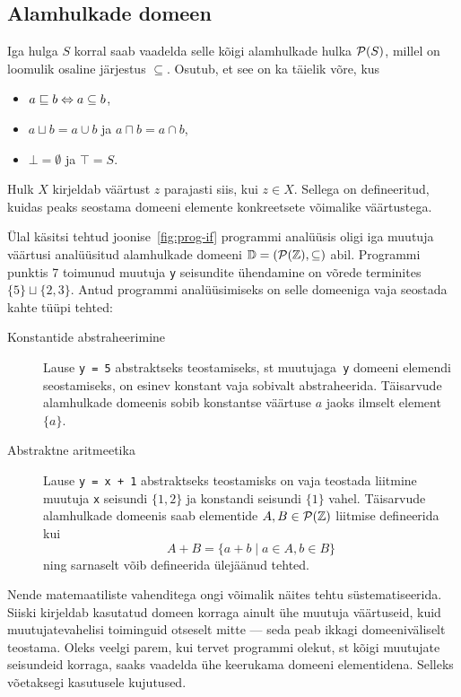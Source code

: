 \documentclass[../thesis.tex]{subfiles}
\begin{document}
\subsection{Alamhulkade domeen}
Iga hulga $S$ korral saab vaadelda selle kõigi alamhulkade hulka $\mathcal{P}(S)$, millel on loomulik osaline järjestus $\subseteq$.
Osutub, et see on ka täielik võre, kus
\begin{itemize}[nosep]
	\item $a \sqsubseteq b \Leftrightarrow a \subseteq b$,
	\item $a \sqcup b = a \cup b$ ja $a \sqcap b = a \cap b$,
	\item $\bot = \emptyset$ ja $\top = S$.
\end{itemize}

Hulk $X$ kirjeldab väärtust $z$ parajasti siis, kui $z \in X$. Sellega on defineeritud, kuidas peaks seostama domeeni elemente konkreetsete võimalike väärtustega.

Ülal käsitsi tehtud joonise~\ref{fig:prog-if} programmi analüüsis oligi iga muutuja väärtusi analüüsitud alamhulkade domeeni $\mathbb{D} = (\mathcal{P}(\mathbb{Z}), \subseteq)$ abil. Programmi punktis 7 toimunud muutuja \texttt{y} seisundite ühendamine on võrede terminites $\{5\} \sqcup \{2, 3\}$. Antud programmi analüüsimiseks on selle domeeniga vaja seostada kahte tüüpi tehted:
\begin{description}
	\item[Konstantide abstraheerimine] Lause \texttt{y = 5} abstraktseks teostamiseks, st muutujaga~\texttt{y} domeeni elemendi seostamiseks, on esinev konstant vaja sobivalt abstraheerida. Täisarvude alamhulkade domeenis sobib konstantse väärtuse $a$ jaoks ilmselt element $\{a\}$.

	\item[Abstraktne aritmeetika] Lause \texttt{y = x + 1} abstraktseks teostamisks on vaja teostada liitmine muutuja \texttt{x} seisundi $\{1, 2\}$ ja konstandi seisundi $\{1\}$ vahel. Täisarvude alamhulkade domeenis saab elementide $A, B \in \mathcal{P}(\mathbb{Z})$ liitmise defineerida kui
	\[
		A + B = \{a + b \mid a \in A, b \in B\}
	\]
	ning sarnaselt võib defineerida ülejäänud tehted.
\end{description}

Nende matemaatiliste vahenditega ongi võimalik näites tehtu süstematiseerida. Siiski kirjeldab kasutatud domeen korraga ainult ühe muutuja väärtuseid, kuid muutujatevahelisi toiminguid otseselt mitte --- seda peab ikkagi domeeniväliselt teostama. Oleks veelgi parem, kui tervet programmi olekut, st kõigi muutujate seisundeid korraga, saaks vaadelda ühe keerukama domeeni elementidena. Selleks võetaksegi kasutusele kujutused.
\end{document}
